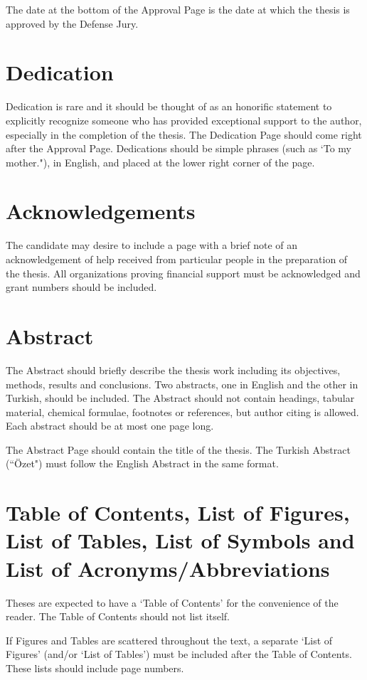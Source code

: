 \documentclass[a4paper,oneside,12pt]{report}
\numberwithin{equation}{chapter}
\begin{document}
The date at the bottom of the Approval Page is the date at which the thesis is
approved by the Defense Jury.


\section{Dedication}
Dedication is rare and it should be thought of as an honorific statement to explicitly recognize someone who has provided exceptional support to the author, especially in the completion of the thesis. The Dedication Page should come right after the Approval Page.
Dedications should be simple phrases (such as `To my mother."), in English, and placed at the lower right corner of the page.


\section{Acknowledgements}
The candidate may desire to include a page with a brief note of an
acknowledgement of help received from particular people in the preparation of the thesis. All organizations proving financial support must be acknowledged and
grant numbers should be included. 

\section{Abstract}
The Abstract should briefly describe the thesis work including its objectives, methods, results and conclusions. Two abstracts, one in
English and the other in Turkish, should be included. The Abstract
should not contain headings, tabular material, chemical formulae, footnotes or references, but author citing is allowed. Each abstract should be at most one page long. 

The Abstract Page should contain the title of the thesis. The Turkish Abstract (``\"{O}zet") must follow the English Abstract in the same format.


\section{Table of Contents, List of Figures, List of
Tables, List
of Symbols and List of Acronyms/Abbreviations}
Theses are expected to have a `Table of Contents' for the convenience
of the reader. The Table of Contents should not list itself.

If Figures and Tables are scattered throughout the text, a
separate `List of Figures' (and/or `List of Tables') must be included
after the Table of Contents. These lists should include page numbers.
\end{document}
